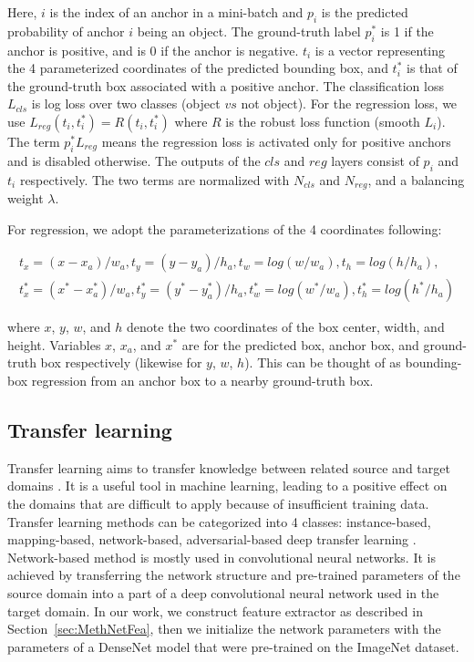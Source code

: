 Here, $i$ is the index of an anchor in a 
mini-batch and $p_i$ is the predicted 
probability of anchor $i$ being an object. 
The ground-truth label $p_i^*$ is 1 if the 
anchor is positive, and is 0 if the anchor 
is negative. $t_i$ is a vector representing 
the 4 parameterized coordinates of the 
predicted bounding box, and $t_i^*$ is that
of the ground-truth box associated with a 
positive anchor. The classification loss 
$L_{cls}$ is log loss over two classes 
(object $vs$ not object). For the regression 
loss, we use 
$L_{reg}(t_i, t_i^*)=R(t_i, t_i^*)$ where $R$
is the robust loss function (smooth $L_i$). 
The term $p_i^*L_{reg}$ means the regression 
loss is activated only for positive anchors 
and is disabled otherwise. The outputs of
the $cls$ and $reg$ layers consist of ${p_i}$ 
and ${t_i}$ respectively. The two terms are 
normalized with $N_{cls}$ and $N_{reg}$, and 
a balancing weight $\lambda$.

For regression, we adopt the parameterizations 
of the 4 coordinates following:

\begin{eqnarray}\label{eq:eq_descr_5}
    t_x=(x-x_a)/w_a, 
    t_y=(y-y_a)/h_a, 
    t_w=log(w/w_a), 
    t_h=log(h/h_a), \\
    t_x^*=(x^*-x^*_a)/w_a, 
    t_y^*=(y^*-y^*_a)/h_a, 
    t_w^*=log(w^*/w_a), 
    t_h^*=log(h^*/h_a)
\end{eqnarray}

where $x$, $y$, $w$, and $h$ denote the two 
coordinates of the box center, width, and 
height. Variables $x$, $x_a$, and $x^*$ are 
for the predicted box, anchor box, and 
ground-truth box respectively (likewise for 
$y$, $w$, $h$). This can be thought of as 
bounding-box regression from an anchor box 
to a nearby ground-truth box.

\subsection{Transfer learning}
\label{sec:MethTL}

Transfer learning aims to transfer knowledge 
between related source and target domains
\cite{Pan2010}.
It is a useful tool in machine learning, 
leading to a positive effect on the domains 
that are difficult to apply because of 
insufficient training data. Transfer learning 
methods can be categorized into 4 classes: 
instance-based, mapping-based, network-based,
adversarial-based deep transfer learning
\cite{Tan2018}.
Network-based method is mostly used in 
convolutional neural networks. It is achieved 
by transferring the network structure and 
pre-trained parameters of the source domain into 
a part of a deep convolutional neural network 
used in the target domain. In our work, 
we construct feature extractor as 
described in Section~\ref{sec:MethNetFea}, 
then we initialize the network parameters 
with the parameters of a DenseNet model 
that were pre-trained on the ImageNet dataset.

